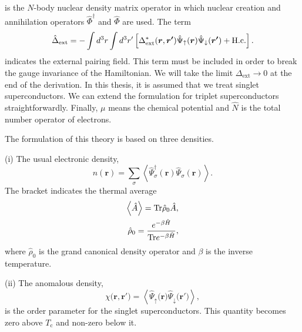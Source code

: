 %
is the $N$-body nuclear density matrix operator in which nuclear creation and annihilation operators 
$\hat{\Phi}^\dag$ and $\hat{\Phi}$ are used. The term
%
\begin{equation} %
	\hat{\Delta}_\mathrm{ext} = - \int d^3r \int d^3r' \left[\Delta^{\ast}_\mathrm{ext}(\bm{r}, \bm{r'})
	                                                                            \hat{\Psi}_\uparrow(\bm{r})\hat{\Psi}_\downarrow(\bm{r'})
	                                                                            + \rm{H.c.} \right].
\end{equation} 
%
indicates the external pairing field. This term must be included in order to break the gauge invariance of
the Hamiltonian. We will take the limit $\Delta_\mathrm{ext} \to 0$ at the end of the derivation.
In this thesis, it is assumed that we treat singlet superconductors. We can extend the formulation 
for triplet superconductors straightforwardly.
Finally, $\mu$ means the chemical potential and $\hat{N}$ is the total number operator of electrons. 

The formulation of this theory is based on three densities. 

(i) The usual electronic density, 
%
\begin{equation} %
	n\left(\bm{r}\right) = \sum_{\sigma}\left<\hat{\Psi}^\dag_\sigma \left(\bm{r}\right)
	                                                               \hat{\Psi}_\sigma \left(\bm{r}\right) \right>.
\end{equation}
%
The bracket indicates the thermal average
%
\begin{equation}
\begin{split}
	\left< \hat{A} \right> = {\rm Tr}\hat{\rho}_0\hat{A}, \\
	\hat{\rho}_0 = \frac{e^{-\beta\hat{H}}}{{\rm Tr}e^{-\beta\hat{H}}},
\end{split}
\end{equation}
%
where $\hat{\rho}_0$ is the grand canonical density operator and $\beta$ is the inverse temperature.

(ii) The anomalous density,
%
\begin{equation} %
	\chi \bigl(\bm{r}, \bm{r'} \bigr) = \left<\hat{\Psi}_\uparrow \bigl(\bm{r}\bigr)
	                                                    \hat{\Psi}_\downarrow \bigl(\bm{r'}\bigr) \right>,
\end{equation}
%
is the order parameter for the singlet superconductors. This quantity becomes zero above 
$T_\mathrm{c}$ and non-zero below it.

